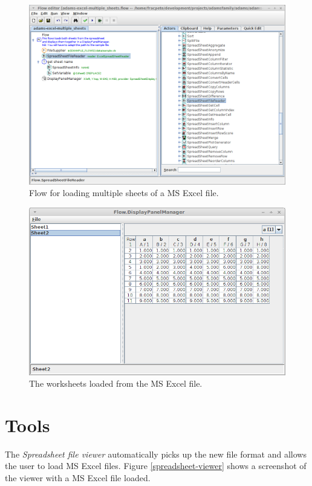 \documentclass[a4paper]{book}
\begin{document}
\begin{figure}[htb]
  \centering
  \includegraphics[width=12.0cm]{images/spreadsheet-display-flow.png}
  \caption{Flow for loading multiple sheets of a MS Excel file.}
  \label{spreadsheet-display-flow}
\end{figure}

\begin{figure}[htb]
  \centering
  \includegraphics[width=12.0cm]{images/spreadsheet-display-output.png}
  \caption{The worksheets loaded from the MS Excel file.}
  \label{spreadsheet-display-output}
\end{figure}

\chapter{Tools}
The \textit{Spreadsheet file viewer} automatically picks up the new file format
and allows the user to load MS Excel files. Figure \ref{spreadsheet-viewer}
shows a screenshot of the viewer with a MS Excel file loaded.
\end{document}
